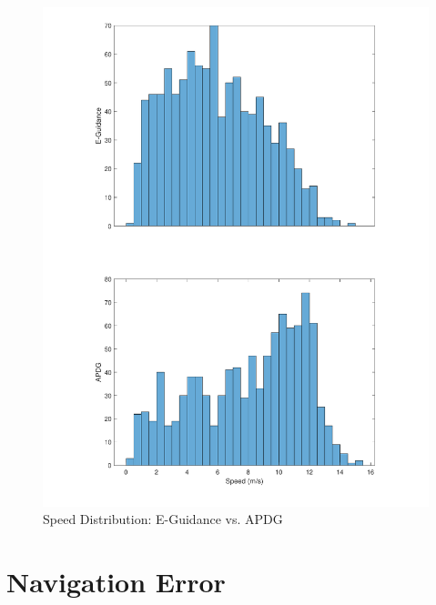 \begin{figure}[H]
	\centering
	\begin{minipage}{4.3 in}
		\includegraphics[width=\linewidth]{Figures/hspdEvsAPDG.pdf}
		\caption{Speed Distribution: E-Guidance vs. APDG \label{fig:hspdEvsAPDG} }
	\end{minipage}
\end{figure}







\section{Navigation Error} \label{sec:naverror}


